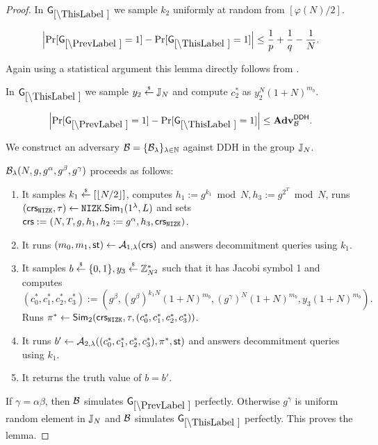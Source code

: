 \begin{proof}
In $\games_\thisgame$ we sample $k_2$ uniformly at random from $[\varphi(N)/2]$. 

\begin{lemma}
\[
\left|\Pr[\games_\prevgame = 1] - \Pr[\games_\thisgame = 1]\right| \leq \frac{1}{p}+\frac{1}{q}-\frac{1}{N}.
\]
\end{lemma}

Again using a statistical argument this lemma directly follows from .

In $\games_\thisgame$ we sample $y_2 \stackrel{{\scriptscriptstyle\$}}{\leftarrow} \mathbb{J}_N$ and compute $c_2^*$ as  $y_2^N(1+N)^{m_b}$. 

\begin{lemma}\label{lem:ddh}
\[
\left|\Pr[\games_\prevgame = 1] - \Pr[\games_\thisgame = 1]\right| \leq \advtg_\advB^\ddh.
\]
\end{lemma}
We construct an adversary $\mathcal{B} = \{\mathcal{B}_{\lambda}\}_{\lambda \in \mathbb{N}}$ against DDH in the group $\mathbb{J}_N$. %

$\mathcal{B}_{\lambda}(N,g,g^\alpha, g^\beta, g^\gamma)$ proceeds as follows:
\vspace{-2mm}
\begin{enumerate}
\item It samples $k_1 \stackrel{{\scriptscriptstyle\$}}{\leftarrow} [\left\lfloor N/2 \right\rfloor]$, computes $h_1 := g^{k_1} \bmod N,  h_3 := g^{2^{T}} \bmod N$, runs $(\mathsf{crs}_{\mathtt{NIZK}}, \tau) \leftarrow \mathtt{NIZK}.\mathsf{Sim}_1(1{^{\lambda}}, L)$ and sets $\mathsf{crs}:=(N, T, g, h_1, h_2:=g^\alpha, h_3, \mathsf{crs}_{\mathtt{NIZK}})$.
\item It runs $(m_0, m_1, \mathsf{st}) \leftarrow \mathcal{A}_{1, \lambda}(\mathsf{crs})$ and answers decommitment queries using $k_1$.
\item It samples $b \stackrel{{\scriptscriptstyle\$}}{\leftarrow} \{0,1\}, y_3 \stackrel{{\scriptscriptstyle\$}}{\leftarrow} \mathbb{Z}_{N^2}^*$ such that it has Jacobi symbol 1 and computes $(c_0^*, c_1^*, c_2^*, c_3^*):=(g^\beta, (g^\beta)^{k_1 N}(1+N)^{m_b}, (g^{\gamma})^N(1+N)^{m_b}, y_3(1+N)^{m_b}).$ Runs $\pi^* \leftarrow \mathsf{Sim}_2(\mathsf{crs}_{\mathtt{NIZK}}, \tau, (c_0^*, c_1^*, c_2^*, c_3^*))$.
\item It runs $b' \leftarrow \mathcal{A}_{2, \lambda}((c_0^*, c_1^*, c_2^*,c_3^*), \pi^*, \mathsf{st})$ and answers decommitment queries using $k_1$.
\item It returns the truth value of $b=b'$.
\end{enumerate}
If $\gamma = \alpha\beta$, then $\mathcal{B}$ simulates $\games_\prevgame$ perfectly. Otherwise $g^\gamma$ is uniform random element in $\mathbb{J}_N$ and $\mathcal{B}$ simulates $\games_\thisgame$ perfectly. This proves the lemma.


\end{proof}
